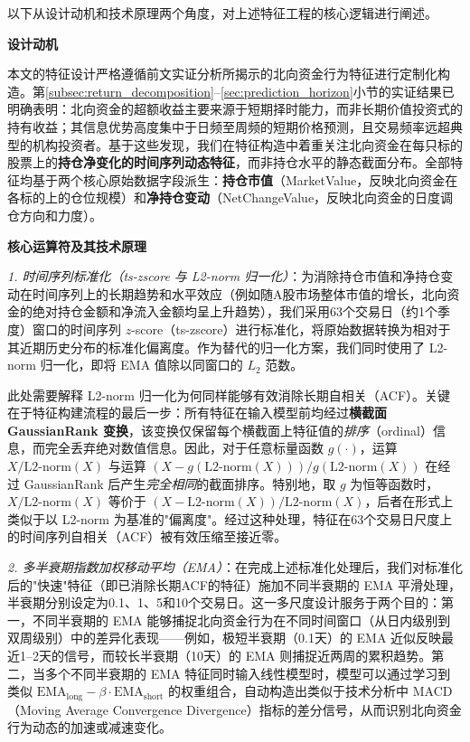 \documentclass{article}
\begin{document}
以下从设计动机和技术原理两个角度，对上述特征工程的核心逻辑进行阐述。

\vspace{0.5em}
\noindent\textbf{设计动机}

本文的特征设计严格遵循前文实证分析所揭示的北向资金行为特征进行定制化构造。第\ref{subsec:return_decomposition}--\ref{sec:prediction_horizon}小节的实证结果已明确表明：北向资金的超额收益主要来源于短期择时能力，而非长期价值投资式的持有收益；其信息优势高度集中于日频至周频的短期价格预测，且交易频率远超典型的机构投资者。基于这些发现，我们在特征构造中着重关注北向资金在每只标的股票上的\textbf{持仓净变化的时间序列动态特征}，而非持仓水平的静态截面分布。全部特征均基于两个核心原始数据字段派生：\textbf{持仓市值}（MarketValue，反映北向资金在各标的上的仓位规模）和\textbf{净持仓变动}（NetChangeValue，反映北向资金的日度调仓方向和力度）。

\vspace{0.5em}
\noindent\textbf{核心运算符及其技术原理}

\textit{1. 时间序列标准化（ts-zscore 与 L2-norm 归一化）}：为消除持仓市值和净持仓变动在时间序列上的长期趋势和水平效应（例如随A股市场整体市值的增长，北向资金的绝对持仓金额和净流入金额均呈上升趋势），我们采用63个交易日（约1个季度）窗口的时间序列 $z$-score（ts-zscore）进行标准化，将原始数据转换为相对于其近期历史分布的标准化偏离度。作为替代的归一化方案，我们同时使用了 L2-norm 归一化，即将 EMA 值除以同窗口的 $L_2$ 范数。

此处需要解释 L2-norm 归一化为何同样能够有效消除长期自相关（ACF）。关键在于特征构建流程的最后一步：所有特征在输入模型前均经过\textbf{横截面 GaussianRank 变换}，该变换仅保留每个横截面上特征值的\textit{排序}（ordinal）信息，而完全丢弃绝对数值信息。因此，对于任意标量函数 $g(\cdot)$，运算 $X / \text{L2-norm}(X)$ 与运算 $(X - g(\text{L2-norm}(X))) / g(\text{L2-norm}(X))$ 在经过 GaussianRank 后产生\textit{完全相同}的截面排序。特别地，取 $g$ 为恒等函数时，$X / \text{L2-norm}(X)$ 等价于 $(X - \text{L2-norm}(X)) / \text{L2-norm}(X)$，后者在形式上类似于以 L2-norm 为基准的"偏离度"。经过这种处理，特征在63个交易日尺度上的时间序列自相关（ACF）被有效压缩至接近零。

\textit{2. 多半衰期指数加权移动平均（EMA）}：在完成上述标准化处理后，我们对标准化后的"快速"特征（即已消除长期ACF的特征）施加不同半衰期的 EMA 平滑处理，半衰期分别设定为0.1、1、5和10个交易日。这一多尺度设计服务于两个目的：第一，不同半衰期的 EMA 能够捕捉北向资金行为在不同时间窗口（从日内级别到双周级别）中的差异化表现——例如，极短半衰期（0.1天）的 EMA 近似反映最近1--2天的信号，而较长半衰期（10天）的 EMA 则捕捉近两周的累积趋势。第二，当多个不同半衰期的 EMA 特征同时输入线性模型时，模型可以通过学习到类似 $\text{EMA}_{\text{long}} - \beta \cdot \text{EMA}_{\text{short}}$ 的权重组合，自动构造出类似于技术分析中 MACD（Moving Average Convergence Divergence）指标的差分信号，从而识别北向资金行为动态的加速或减速变化。
\end{document}
